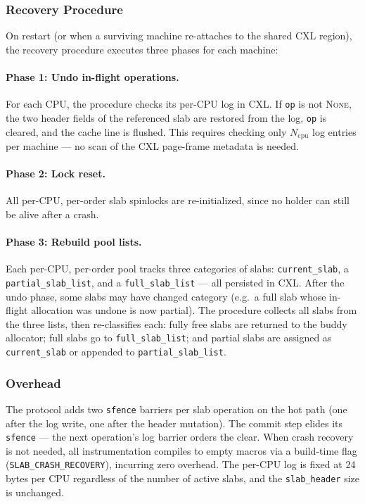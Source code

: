 \subsubsection{Recovery Procedure}

On restart (or when a surviving machine re-attaches to the shared CXL
region), the recovery procedure executes three phases for each machine:

\paragraph{Phase 1: Undo in-flight operations.}
For each CPU, the procedure checks its per-CPU log in CXL.
If \texttt{op} is not \textsc{None}, the two header fields of the
referenced slab are restored from the log, \texttt{op} is cleared,
and the cache line is flushed.
This requires checking only $N_{\text{cpu}}$ log entries per machine —
no scan of the CXL page-frame metadata is needed.

\paragraph{Phase 2: Lock reset.}
All per-CPU, per-order slab spinlocks are re-initialized,
since no holder can still be alive after a crash.

\paragraph{Phase 3: Rebuild pool lists.}
Each per-CPU, per-order pool tracks three categories of slabs:
\texttt{current\_slab}, a \texttt{partial\_slab\_list}, and a
\texttt{full\_slab\_list} — all persisted in CXL.
After the undo phase, some slabs may have changed category
(e.g.\ a full slab whose in-flight allocation was undone is now partial).
The procedure collects all slabs from the three lists, then
re-classifies each:
fully free slabs are returned to the buddy allocator;
full slabs go to \texttt{full\_slab\_list};
and partial slabs are assigned as \texttt{current\_slab} or appended
to \texttt{partial\_slab\_list}.

\subsubsection{Overhead}

The protocol adds two \texttt{sfence} barriers per slab operation
on the hot path (one after the log write, one after the header
mutation).
The commit step elides its \texttt{sfence} — the next operation's
log barrier orders the clear.
When crash recovery is not needed, all instrumentation compiles to
empty macros via a build-time flag (\texttt{SLAB\_CRASH\_RECOVERY}),
incurring zero overhead.
The per-CPU log is fixed at 24\,bytes per CPU regardless of the number
of active slabs, and the \texttt{slab\_header} size is unchanged.


